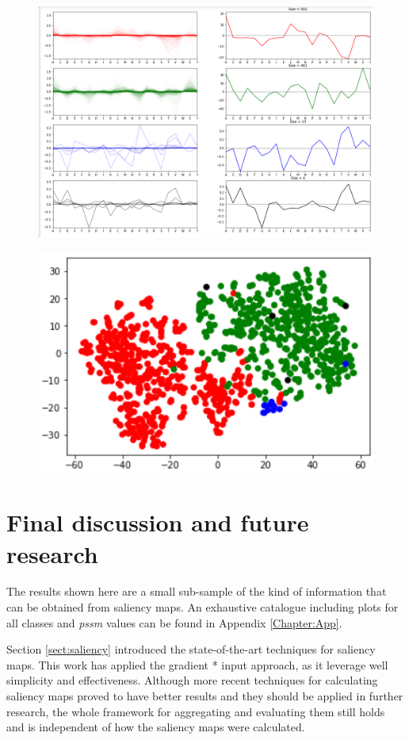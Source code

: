 \begin{figure}
	\centering
	\includegraphics[width=1\linewidth]{Figures/clusters}
	\caption{}
	\label{fig:clusters}
\end{figure}

\begin{figure}
	\centering
	\includegraphics[width=0.7\linewidth]{tsne}
	\caption{}
	\label{fig:tsne}
\end{figure}


\section{Final discussion and future research}
The results shown here are a small sub-sample of the kind of information that can be obtained from saliency maps. An exhaustive catalogue including plots for all classes and \textit{pssm} values can be found in Appendix \ref{Chapter:App}.

Section \ref{sect:saliency} introduced the state-of-the-art techniques for saliency maps. This work has applied the gradient * input approach, as it leverage well simplicity and effectiveness. Although more recent techniques for calculating saliency maps proved to have better results and they should be applied in further research, the whole framework for aggregating and evaluating them still holds and is independent of how the saliency maps were calculated.


